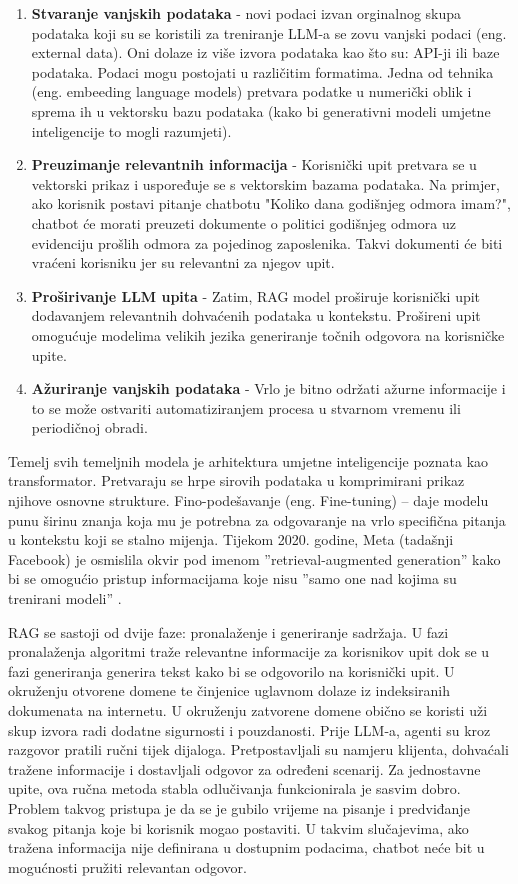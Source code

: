 \documentclass[]{foi}
\begin{document}
\begin{enumerate}
    \item \textbf{Stvaranje vanjskih podataka} - novi podaci izvan orginalnog skupa podataka koji su se koristili za treniranje LLM-a se zovu 
    vanjski podaci (eng. external data). Oni dolaze iz više izvora podataka kao što su: API-ji ili baze podataka. Podaci mogu postojati u različitim formatima.
    Jedna od tehnika (eng. embeeding language models) pretvara podatke u numerički oblik i sprema ih u vektorsku bazu podataka 
    (kako bi generativni modeli umjetne inteligencije to mogli razumjeti).
    \item \textbf{Preuzimanje relevantnih informacija} - Korisnički upit pretvara se u vektorski prikaz i uspoređuje se s vektorskim bazama podataka.
    Na primjer, ako korisnik postavi pitanje chatbotu "Koliko dana godišnjeg odmora imam?", chatbot će morati preuzeti dokumente o politici godišnjeg 
    odmora uz evidenciju prošlih odmora za pojedinog zaposlenika. Takvi dokumenti će biti vraćeni korisniku jer su relevantni za njegov upit.
    \item \textbf{Proširivanje LLM upita} - Zatim, RAG model proširuje korisnički upit dodavanjem relevantnih dohvaćenih podataka u kontekstu. 
    Prošireni upit omogućuje modelima velikih jezika generiranje točnih odgovora na korisničke upite.
    \item \textbf{Ažuriranje vanjskih podataka} - Vrlo je bitno održati ažurne informacije i to se može ostvariti automatiziranjem procesa u stvarnom vremenu ili periodičnoj obradi. 
\end{enumerate}


Temelj svih temeljnih modela je arhitektura umjetne inteligencije poznata kao transformator. Pretvaraju se hrpe sirovih podataka u komprimirani prikaz njihove osnovne strukture. 
Fino-podešavanje (eng. Fine-tuning) – daje modelu punu širinu znanja koja mu je potrebna za odgovaranje na vrlo specifična pitanja u kontekstu koji se stalno mijenja. Tijekom 2020. godine, 
Meta (tadašnji Facebook) je osmislila okvir pod imenom ”retrieval-augmented generation” kako bi se omogućio pristup informacijama koje nisu ”samo one nad kojima su trenirani modeli” \cite{ibmRAG}.

RAG se sastoji od dvije faze: pronalaženje i generiranje sadržaja. U fazi pronalaženja algoritmi traže relevantne informacije za korisnikov upit dok se u fazi generiranja generira tekst 
kako bi se odgovorilo na korisnički upit. U okruženju otvorene domene te činjenice uglavnom dolaze iz indeksiranih dokumenata na internetu. U okruženju zatvorene domene obično se koristi 
uži skup izvora radi dodatne sigurnosti i pouzdanosti. Prije LLM-a, agenti su kroz razgovor pratili ručni tijek dijaloga. Pretpostavljali su namjeru klijenta, dohvaćali tražene informacije 
i dostavljali odgovor za određeni scenarij. Za jednostavne upite, ova ručna metoda stabla odlučivanja funkcionirala je sasvim dobro. Problem takvog pristupa je da se je gubilo vrijeme na 
pisanje i predviđanje svakog pitanja koje bi korisnik mogao postaviti. U takvim slučajevima, ako tražena informacija nije definirana u dostupnim podacima, chatbot neće bit u mogućnosti 
pružiti relevantan odgovor\cite{ibmRAG}. 
\end{document}
